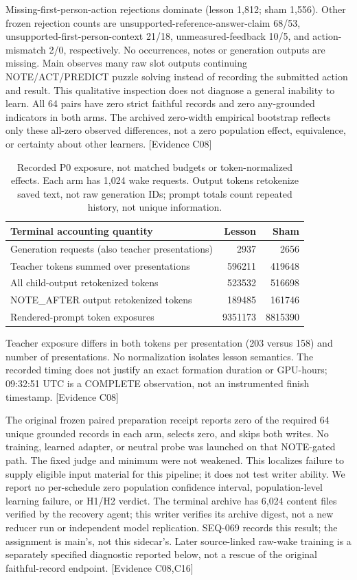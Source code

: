 \documentclass[11pt]{article}
\newcommand{\ev}[1]{\textsf{[Evidence #1]}}
\begin{document}
Missing-first-person-action rejections dominate (lesson 1,812; sham 1,556).
Other frozen rejection counts are unsupported-reference-answer-claim 68/53,
unsupported-first-person-context 21/18, unmeasured-feedback 10/5, and
action-mismatch 2/0, respectively. No occurrences, notes or generation outputs
are missing. Main observes many raw
slot outputs continuing NOTE/ACT/PREDICT puzzle solving instead of recording the
submitted action and result. This qualitative inspection does not diagnose a
general inability to learn. All 64 pairs have zero strict faithful records and
zero any-grounded indicators in both arms. The archived zero-width empirical
bootstrap reflects only these all-zero observed differences, not a zero
population effect, equivalence, or certainty about other learners. \ev{C08}

\begin{table}[htbp]
\centering\small
\begin{tabular}{lrr}
\toprule
Terminal accounting quantity & Lesson & Sham \\
\midrule
Generation requests (also teacher presentations) & 2937 & 2656 \\
Teacher tokens summed over presentations & 596211 & 419648 \\
All child-output retokenized tokens & 523532 & 516698 \\
NOTE\_AFTER output retokenized tokens & 189485 & 161746 \\
Rendered-prompt token exposures & 9351173 & 8815390 \\
\bottomrule
\end{tabular}
\caption{Recorded P0 exposure, not matched budgets or token-normalized effects.
Each arm has 1,024 wake requests. Output tokens retokenize saved text, not raw
generation IDs; prompt totals count repeated history, not unique information.}
\label{tab:p0cost}
\end{table}

Teacher exposure differs in both tokens per presentation (203 versus 158) and
number of presentations. No normalization isolates lesson semantics. The
recorded timing does not justify an exact formation duration or GPU-hours;
09:32:51 UTC is a COMPLETE observation, not an instrumented finish timestamp.
\ev{C08}

The original frozen paired preparation receipt reports zero of the required 64
unique grounded records in each arm, selects zero, and skips both writes. No
training, learned adapter, or neutral probe was launched on that NOTE-gated path. The fixed judge and
minimum were not weakened. This localizes failure to supply eligible input
material for this pipeline; it does not test writer ability. We report no
per-schedule zero population confidence interval, population-level learning
failure, or H1/H2 verdict. The terminal archive has 6,024 content files verified
by the recovery agent; this writer verifies its archive digest, not a new
reducer run or independent model replication. SEQ-069 records this result;
the assignment is main's, not this sidecar's. Later source-linked raw-wake
training is a separately specified diagnostic reported below, not a rescue of
the original faithful-record endpoint. \ev{C08,C16}
\end{document}
